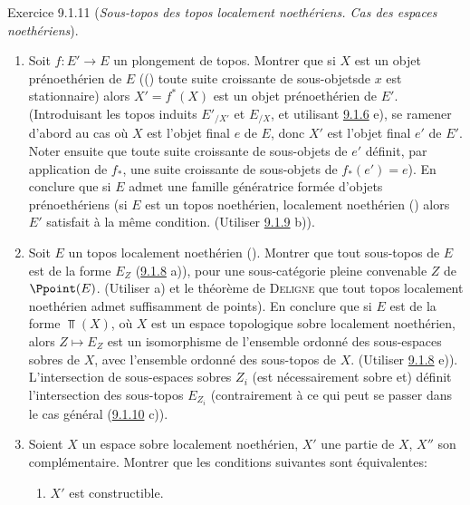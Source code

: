 \begin{enonce*}[remark]{Exercice 9.1.11}
(\emph{Sous-topos des topos localement noethériens. Cas des espaces
noethériens}).
\begin{enumerate}
\renewcommand{\theenumi}{\alph{enumi}}
\renewcommand{\labelenumi}{\theenumi)}
\item Soit $f:E'\rightarrow E$ un plongement de topos. Montrer que si
$X$ est un objet prénoethérien de $E$ (\ie () toute suite
croissante de sous-objets\pageoriginale de $x$ est stationnaire)
alors $X'=f^{\ast}(X)$ est un objet prénoethérien de $E'$.
(Introduisant les topos induits ${E'}_{/X'}$ et $E_{/X}$, et
utilisant \hyperref[IV.exer9.1.6]{9.1.6} e), se ramener d'abord au cas où $X$
est l'objet final $e$ de $E$, donc $X'$ est l'objet final $e'$ de
$E'$. Noter ensuite que toute suite croissante de sous-objets de
$e'$ définit, par application de $f_{\ast}$, une suite croissante de
sous-objets de $f_{\ast}(e')=e$). En conclure que si $E$ admet une
famille génératrice formée d'objets prénoethériens (\resp si $E$ est
un topos noethérien, \resp localement noethérien () alors $E'$
satisfait à la même condition. (Utiliser \hyperref[IV.exer9.1.9]{9.1.9} b)).

\item Soit $E$ un topos localement noethérien (). Montrer que
tout sous-topos de $E$ est de la forme $E_Z$ (\hyperref[IV.exer9.1.8]{9.1.8}
a)), pour une sous-catégorie pleine convenable $Z$ de $\Ppoint(E)$.
(Utiliser a) et le théorème de \textsc{Deligne} que tout topos
localement noethérien admet suffisamment de points). En conclure que
si $E$ est de la forme $\Top(X)$, où $X$ est un espace topologique
sobre localement noethérien, alors $Z\mapsto E_Z$ est un
isomorphisme de l'ensemble ordonné des sous-espaces sobres de $X$,
avec l'ensemble ordonné des sous-topos de $X$. (Utiliser
\hyperref[IV.exer9.1.8]{9.1.8} e)). L'intersection de sous-espaces sobres $Z_i$
(est nécessairement sobre et) définit l'intersection des sous-topos
$E_{Z_i}$ (contrairement à ce qui peut se passer dans le cas général
(\hyperref[IV.exer9.1.10]{9.1.10} c)).

\item Soient $X$ un espace sobre localement noethérien, $X'$ une
partie de $X$, $X''$ son complémentaire. Montrer que les conditions
suivantes sont équivalentes:
\begin{enumerate}
\renewcommand{\theenumii}{\roman{enumii}}
\renewcommand{\labelenumii}{(\theenumii)}
\item $X'$ est constructible.


\end{enumerate}
\end{enumerate}
\end{enonce*}
